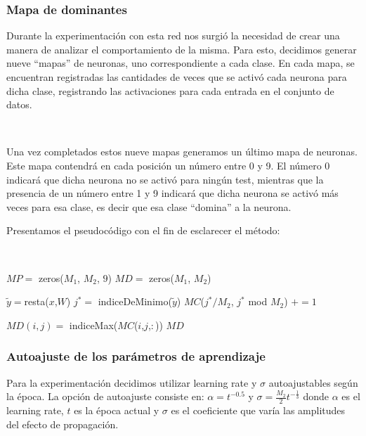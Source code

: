 \documentclass[informe.tex]{subfiles}
\begin{document}
	\subsubsection{Mapa de dominantes}
      
	Durante la experimentación con esta red nos surgió la necesidad de crear una manera de analizar el comportamiento de la misma. Para esto, decidimos generar nueve ``mapas'' de neuronas, uno correspondiente a cada clase. En cada mapa, se encuentran registradas las cantidades de veces que se activó cada neurona para dicha clase, registrando las activaciones para cada entrada en el conjunto de datos.
	
	~
	
	Una vez completados estos nueve mapas generamos un \'ultimo mapa de neuronas. Este mapa contendr\'a en cada posición un número entre 0 y 9. El n\'umero 0 indicará que dicha neurona no se activó para ning\'un test, mientras que la presencia de un n\'umero entre 1 y 9 indicar\'a que dicha neurona se activó más veces para esa clase, es decir que esa clase ``domina'' a la neurona.
	
	\newpage
	
	Presentamos el pseudocódigo con el fin de esclarecer el m\'etodo:
	
	~
	
	\begin{algorithmic}
	      \State $MP =$ zeros($M_1$, $M_2$, $9$)
	      \State $MD =$ zeros($M_1$, $M_2$)
	      
		\State $\tilde{y}= $resta($x$,$W$)
		\State $j^* =$ indiceDeMinimo($\tilde{y}$)
		\State $MC$($j^*/M_2$, $j^*$ mod $M_2$) $+= 1$ 
	      \EndFor
	      
		  \State $MD(i,j) =$ indiceMax($MC$($i$,$j$,$:$))
		\EndFor
	      \EndFor
	      \State \Return $MD$
	    \EndFunction
	  \end{algorithmic} 
	
	\subsubsection{Autoajuste de los parámetros de aprendizaje}
	  Para la experimentación decidimos utilizar learning rate y $\sigma$ autoajustables según la época. La opción de autoajuste consiste en: $\alpha = t^{-0.5}$ y $\sigma = \frac{M_2}{2}t^{-\frac{1}{3}}$ donde $\alpha$ es el learning rate, $t$ es la época actual y $\sigma$ es el coeficiente que varía las amplitudes del efecto de propagación.
\end{document}

